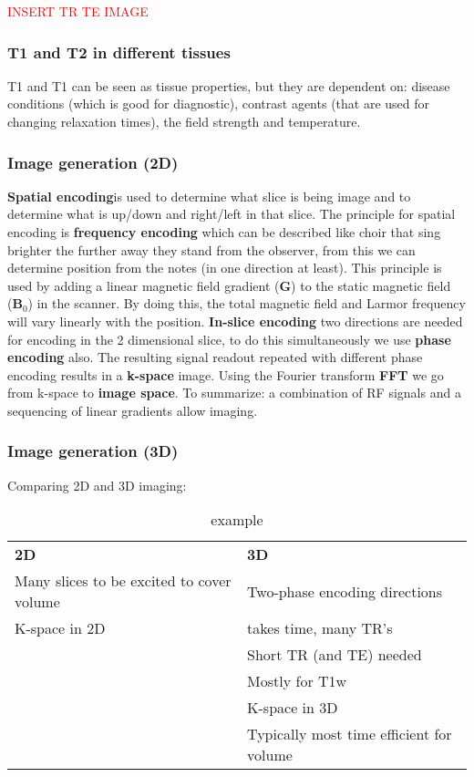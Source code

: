 		\textcolor{red}{INSERT TR TE IMAGE} 
		
		\subsubsection*{T1 and T2 in different tissues}
		T1 and T1 can be seen as tissue properties, but they are dependent on: disease conditions (which is good for diagnostic), contrast agents (that are used for changing relaxation times), the field strength and temperature.

		\subsubsection*{Image generation (2D)}
		\textbf{Spatial encoding}is used to determine what slice is being image and to determine what is up/down and right/left in that slice. The principle for spatial encoding is \textbf{frequency encoding} which can be described like choir that sing brighter the further away they stand from the observer, from this we can determine position from the notes (in one direction at least). This principle is used by adding a linear magnetic field gradient (\textbf{G}) to the static magnetic field (\textbf{B}$_0$) in the scanner. By doing this, the total magnetic field and Larmor frequency will vary linearly with the position.
		\textbf{In-slice encoding} two directions are needed for encoding in the 2 dimensional slice, to do this simultaneously we use \textbf{phase encoding} also. The resulting signal readout repeated with different phase encoding results in a \textbf{k-space} image. Using the Fourier transform \textbf{FFT} we go from k-space to \textbf{image space}. To summarize: a combination of RF signals and a sequencing of linear gradients allow imaging.  
		
		\subsubsection*{Image generation (3D)}
		Comparing 2D and 3D imaging:

			\begin{table}[ht!]
			\centering
			\begin{tabular}{ll}\hline
			 \textbf{2D}&   \textbf{3D} \\
			 Many slices to be excited to cover volume&  Two-phase encoding directions  \\
			 K-space in 2D& takes time, many TR's  \\
			 &  Short TR (and TE) needed \\
			 & Mostly for T1w   \\
			 & K-space in 3D \\
			 & Typically most time efficient for volume \\ \hline
			\end{tabular}
			\caption{example}
			\label{tab:tab1}
			\end{table}

